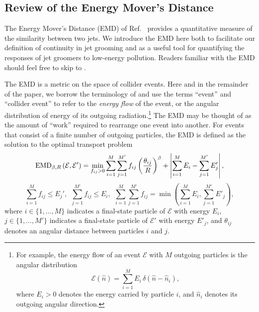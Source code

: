 \subsection{Review of the Energy Mover's Distance}
\label{sec:emd}
The Energy Mover's Distance (EMD) of Ref.~\cite{Komiske:2019fks} provides a quantitative measure of the similarity between two jets.
%
We introduce the EMD here both to facilitate our definition of continuity in jet grooming and as a useful tool for quantifying the responses of jet groomers to low-energy pollution.
%
Readers familiar with the EMD should feel free to skip to .

The EMD is a metric on the space of collider events.
%
Here and in the remainder of the paper, we borrow the terminology of  and use the terms ``event'' and ``collider event'' to refer to the \textit{energy flow} of the event, or the angular distribution of energy of its outgoing radiation.\footnote{
For example, the energy flow of an event \(\mathcal E\) with \(M\) outgoing particles is the angular distribution
\begin{equation*}
    \label{eqn:energyflow}
    \mathcal E(\hat n)
    =
    \sum_{i=1}^ME_i\,\delta(\hat n - \hat n_i),
\end{equation*}
where $E_i > 0$ denotes the energy carried by particle \(i\), and $\hat n_i$ denotes its outgoing angular direction.
}
%
The EMD may be thought of as the amount of ``work'' required to rearrange one event into another.
%
For events that consist of a finite number of outgoing particles, the EMD is defined as the solution to the optimal transport problem
\begin{equation}
    \label{eqn:EMD_def_1}
    {\rm EMD}_{\beta, R}\left(\mathcal{E}, \mathcal{E}'\right)
    =
    \min_{f_{ij} > 0} \sum_{i = 1}^M \sum_{j = 1}^{M'} f_{ij} \left(\frac{\theta_{ij}}{R}\right)^\beta
    +
    \left| \sum_{i = 1}^M E_i -  \sum_{j = 1}^{M'} E'_j\right|,
\end{equation}
\begin{equation}
    \sum_{i = 1}^M f_{ij} \leq E_j',
    ~~
    \sum_{j = 1}^{M'} f_{ij} \leq E_i,
    ~~
    \sum_{i = 1}^M \sum_{j = 1}^{M'} f_{ij}
    = \min\left(\sum_{i = 1}^M E_i, \sum_{j = 1}^{M'} E'_j\right)
    \label{eqn:EMD_def_2}
    ,
\end{equation}
where \(i \in \{1, ..., M\}\) indicates a final-state particle of \(\mathcal{E}\) with energy \(E_i\), \(j \in \{1, ..., M'\}\) indicates a final-state particle of \(\mathcal{E}'\) with energy \(E'_j\), and \(\theta_{ij}\) denotes an angular distance between particles \(i\) and \(j\).
